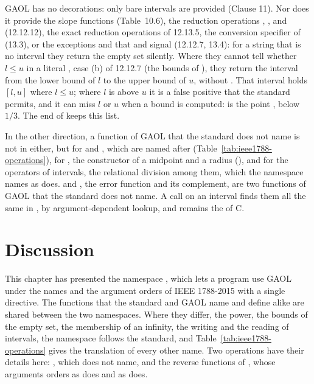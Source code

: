GAOL has no decorations: only bare intervals are provided (Clause 11). Nor
does it provide the slope functions (Table~10.6), the reduction operations
, ,  and  (12.12.12), the
exact reduction operations of 12.13.5, the conversion specifier  of
 (13.3), or the exceptions  and
 that  and
 signal (12.12.7, 13.4): for a string that is no
interval they return the empty set silently. Where they cannot tell whether
$l \le u$ in a literal \code{[l, u]}, case (b) of 12.12.7 (the bounds of
), they return the interval from the lower bound
of $l$ to the upper bound of $u$, without .
That interval holds $[l, u]$ where $l \le u$; where $l$ is above $u$ it is a
false positive that the standard permits, and it can miss $l$ or $u$ when a
bound is computed:  is the point
, below $1/3$. The end of
 keeps this list.

\begin{Rem}\label{rem:ieee1788-erf}
In the other direction, a function of GAOL that the standard does not name
is not in  either, but for  and
, which are named after 
(Table~\ref{tab:ieee1788-operations}), for , the
constructor  of a midpoint and a radius
(), and for the operators of intervals, the
relational division \code{\%} among them, which the namespace names as
 does.  and , the
error function and its complement, are two functions of GAOL that the
standard does not name.\newinvfive{} A call
 on an interval finds them all the same in ,
by argument-dependent lookup, and  remains the 
of C.
\end{Rem}

\section{Discussion}

This chapter has presented the namespace , which lets a
program use GAOL under the names and the argument orders of IEEE 1788-2015
with a single directive. The functions that the standard and GAOL name and
define alike are shared between the two namespaces. Where they differ, the
power, the bounds of the empty set, the membership of an infinity, the
writing and the reading of intervals, the namespace follows the standard, and Table~\ref{tab:ieee1788-operations}
gives the translation of every other name. Two operations have their
details here: , which  does not name, and the
reverse functions of , whose arguments 
orders as  does and  as  does.

